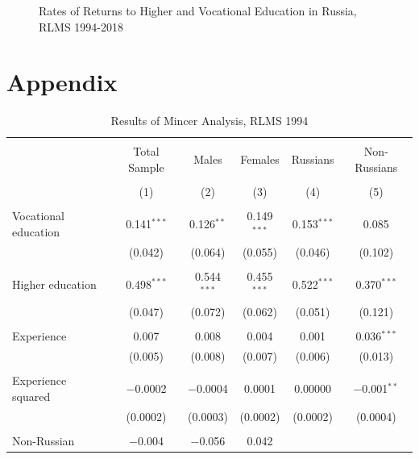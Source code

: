 \documentclass[12pt,a4paper]{article}
\begin{document}
\begin{figure}[H]
\begin{minipage}[b]{.5\linewidth}
     \label{fig:3b}
  \end{minipage}
  \caption{Rates of Returns to Higher and Vocational Education in Russia, RLMS 1994-2018}\label{fig:4}
\end{figure}

\printbibliography  

\newpage
\section*{Appendix}

\begin{table}[!htbp] \centering 
  \caption{Results of Mincer Analysis, RLMS 1994} 
  \label{} 
\begin{tabular}{@{\extracolsep{5pt}}lccccc} 
\\[-1.8ex]\hline 
\hline \\[-1.8ex] 
 & Total Sample & Males & Females & Russians & Non-Russians \\ 
\\[-1.8ex] & (1) & (2) & (3) & (4) & (5)\\ 
\hline \\[-1.8ex] 
 Vocational education & 0.141$^{***}$ & 0.126$^{**}$ & 0.149$^{***}$ & 0.153$^{***}$ & 0.085 \\ 
  & (0.042) & (0.064) & (0.055) & (0.046) & (0.102) \\ 
  & & & & & \\ 
 Higher education & 0.498$^{***}$ & 0.544$^{***}$ & 0.455$^{***}$ & 0.522$^{***}$ & 0.370$^{***}$ \\ 
  & (0.047) & (0.072) & (0.062) & (0.051) & (0.121) \\ 
  & & & & & \\ 
 Experience & 0.007 & 0.008 & 0.004 & 0.001 & 0.036$^{***}$ \\ 
  & (0.005) & (0.008) & (0.007) & (0.006) & (0.013) \\ 
  & & & & & \\ 
 Experience squared & $-$0.0002 & $-$0.0004 & 0.0001 & 0.00000 & $-$0.001$^{**}$ \\ 
  & (0.0002) & (0.0003) & (0.0002) & (0.0002) & (0.0004) \\ 
  & & & & & \\ 
 Non-Russian & $-$0.004 & $-$0.056 & 0.042 &  &  \\ 

\end{tabular}
\end{table}
\end{document}
